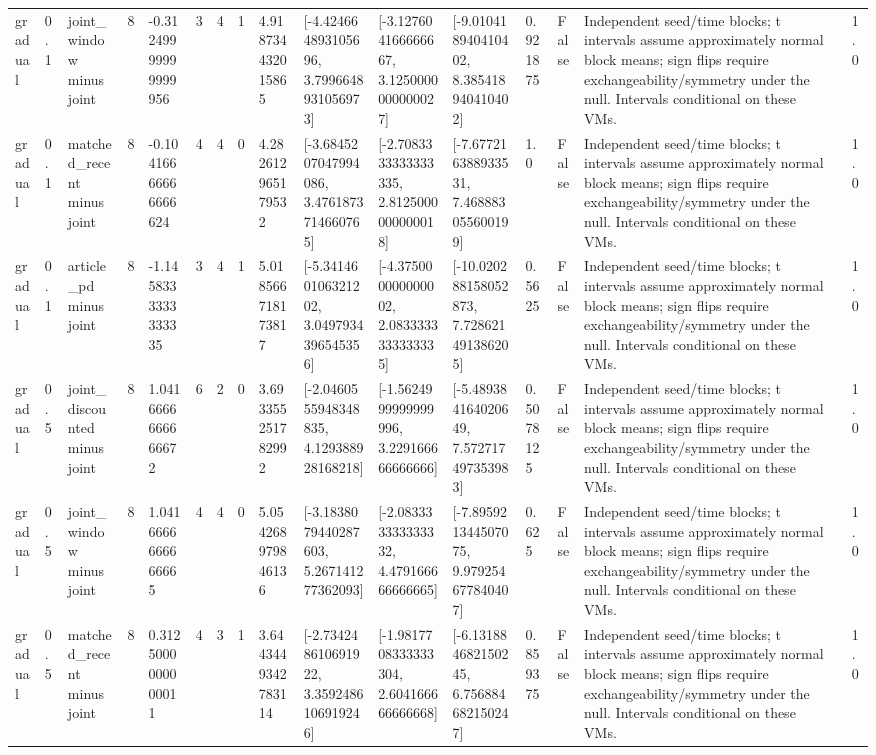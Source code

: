 \begin{tabular}{lllllllllllllllll}
gradual & 0.1 & joint\_window minus joint & 8 & -0.31249999999999956 & 3 & 4 & 1 & 4.918734432015865 & [-4.424664893105696, 3.7996648931056973] & [-3.127604166666667, 3.1250000000000027] & [-9.010418940410402, 8.385418940410402] & 0.921875 & False & Independent seed/time blocks; t intervals assume approximately normal block means; sign flips require exchangeability/symmetry under the null. Intervals conditional on these VMs. &  & 1.0 \\
gradual & 0.1 & matched\_recent minus joint & 8 & -0.10416666666666624 & 4 & 4 & 0 & 4.282612965179532 & [-3.6845207047994086, 3.4761873714660765] & [-2.7083333333333335, 2.8125000000000018] & [-7.677216388933531, 7.468883055600199] & 1.0 & False & Independent seed/time blocks; t intervals assume approximately normal block means; sign flips require exchangeability/symmetry under the null. Intervals conditional on these VMs. &  & 1.0 \\
gradual & 0.1 & article\_pd minus joint & 8 & -1.1458333333333335 & 3 & 4 & 1 & 5.018566718173817 & [-5.341460106321202, 3.0497934396545356] & [-4.375000000000002, 2.0833333333333335] & [-10.020288158052873, 7.728621491386205] & 0.5625 & False & Independent seed/time blocks; t intervals assume approximately normal block means; sign flips require exchangeability/symmetry under the null. Intervals conditional on these VMs. &  & 1.0 \\
gradual & 0.5 & joint\_discounted minus joint & 8 & 1.0416666666666672 & 6 & 2 & 0 & 3.693355251782992 & [-2.0460555948348835, 4.129388928168218] & [-1.5624999999999996, 3.229166666666666] & [-5.489384164020649, 7.572717497353983] & 0.5078125 & False & Independent seed/time blocks; t intervals assume approximately normal block means; sign flips require exchangeability/symmetry under the null. Intervals conditional on these VMs. &  & 1.0 \\
gradual & 0.5 & joint\_window minus joint & 8 & 1.0416666666666665 & 4 & 4 & 0 & 5.054268979846136 & [-3.1838079440287603, 5.267141277362093] & [-2.083333333333332, 4.479166666666665] & [-7.895921344507075, 9.979254677840407] & 0.625 & False & Independent seed/time blocks; t intervals assume approximately normal block means; sign flips require exchangeability/symmetry under the null. Intervals conditional on these VMs. &  & 1.0 \\
gradual & 0.5 & matched\_recent minus joint & 8 & 0.3125000000000011 & 4 & 3 & 1 & 3.6443449342783114 & [-2.734248610691922, 3.3592486106919246] & [-1.9817708333333304, 2.604166666666668] & [-6.131884682150245, 6.756884682150247] & 0.859375 & False & Independent seed/time blocks; t intervals assume approximately normal block means; sign flips require exchangeability/symmetry under the null. Intervals conditional on these VMs. &  & 1.0 \\

\end{tabular}
